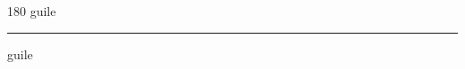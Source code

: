 
\begin{frame}
\begin{center}
\begin{turn}{180}
{\fontsize{2.5cm}{1em}\selectfont guile}
\end{turn}
\vspace{1em}\par  
\hrule
\vspace{1em}\par  
{\fontsize{2.5cm}{1em}\selectfont guile}
\end{center}
\end{frame}
